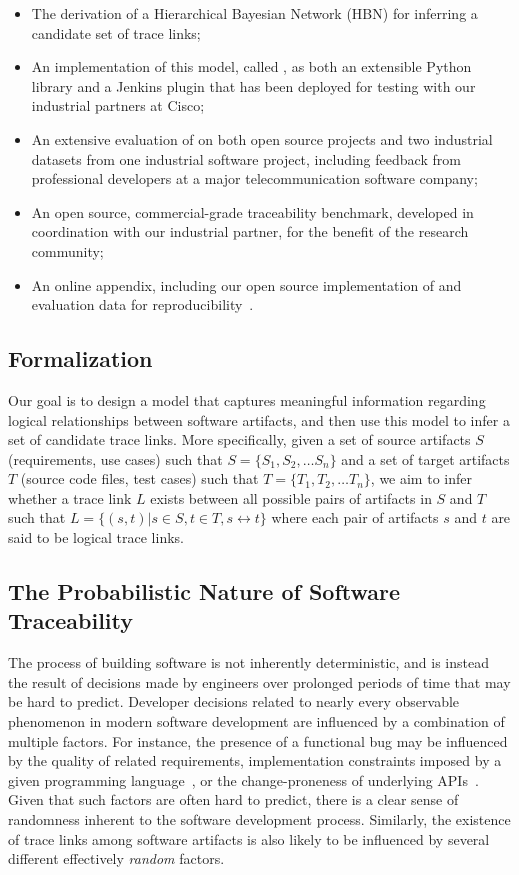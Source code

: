 \begin{itemize}
	\item{The derivation of a Hierarchical Bayesian Network (HBN) for inferring a candidate set of trace links;}	
	\item{An implementation of this model, called \Comet, as both an extensible Python library and a Jenkins plugin that has been deployed for testing with our industrial partners at Cisco;}
	\item{An extensive evaluation of \Comet on both open source projects and two industrial datasets from one industrial software project, including feedback from professional developers at a major telecommunication software company;}
	\item{An open source, commercial-grade traceability benchmark, developed in coordination with our industrial partner, for the benefit of the research community;}
	\item{An online appendix, including our open source implementation of \Comet and evaluation data for reproducibility~\cite{appendix}}.
\end{itemize}

\subsection{Formalization}

Our goal is to design a model that captures meaningful information regarding logical relationships between software artifacts, and then use this model to infer a set of candidate trace links. More specifically, given a set of source artifacts $S$ (\eg requirements, use cases) such that $S = \{S_{1},S_{2},\ldots S_{n}\}$ and a set of target artifacts $T$ (\eg source code files, test cases) such that $T = \{T_{1},T_{2},\ldots T_{n}\}$, we aim to infer whether a trace link $L$ exists between all possible pairs of artifacts in $S$ and $T$ such that $L = \{(s,t) | s\in S, t\in T, s\leftrightarrow t\}$ where each pair of artifacts $s$ and $t$ are said to be logical trace links.


\subsection{The Probabilistic Nature of Software Traceability}
The process of building software is not inherently deterministic, and is instead the result of decisions made by engineers over prolonged periods of time that may be hard to predict. Developer decisions related to nearly every observable phenomenon in modern software development are influenced by a combination of multiple factors. For instance, the presence of a functional bug may be influenced by the quality of related requirements, implementation constraints imposed by a given programming language~\citep{Ray:CACM'17}, or the change-proneness of underlying APIs~\citep{Linares-Vasquez:FSE'13}. Given that such factors are often hard to predict, there is a clear sense of randomness inherent to the software development process. Similarly, the existence of trace links among software artifacts is also likely to be influenced by several different effectively \textit{random} factors.  

